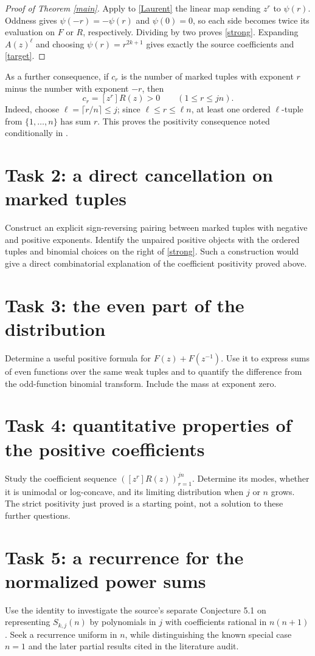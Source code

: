 \documentclass[11pt]{article}
\begin{document}
\begin{proof}[Proof of Theorem \ref{main}]
Apply to \eqref{Laurent} the linear map sending $z^r$ to
$\psi(r)$. Oddness gives $\psi(-r)=-\psi(r)$ and $\psi(0)=0$,
so each side becomes twice its evaluation on $F$ or $R$,
respectively. Dividing by two proves \eqref{strong}. Expanding
$A(z)^\ell$ and choosing $\psi(r)=r^{2k+1}$ gives exactly the
source coefficients and \eqref{target}.
\end{proof}

As a further consequence, if $c_r$ is the number of marked tuples
with exponent $r$ minus the number with exponent $-r$, then
\[
 c_r=[z^r]R(z)>0\qquad(1\leq r\leq jn).
\]
Indeed, choose $\ell=\lceil r/n\rceil\leq j$; since
$\ell\leq r\leq\ell n$, at least one ordered $\ell$-tuple from
$\{1,\ldots,n\}$ has sum $r$. This proves the positivity
consequence noted conditionally in \cite{SS}.

\section*{Task 2: a direct cancellation on marked tuples}
Construct an explicit sign-reversing pairing between marked
tuples with negative and positive exponents. Identify the
unpaired positive objects with the ordered tuples and binomial
choices on the right of \eqref{strong}. Such a construction would
give a direct combinatorial explanation of the coefficient
positivity proved above.

\section*{Task 3: the even part of the distribution}
Determine a useful positive formula for $F(z)+F(z^{-1})$.
Use it to express sums of even functions over the same weak
tuples and to quantify the difference from the odd-function
binomial transform. Include the mass at exponent zero.

\section*{Task 4: quantitative properties of the positive coefficients}
Study the coefficient sequence $([z^r]R(z))_{r=1}^{jn}$.
Determine its modes, whether it is unimodal or log-concave, and
its limiting distribution when $j$ or $n$ grows. The strict
positivity just proved is a starting point, not a solution to
these further questions.

\section*{Task 5: a recurrence for the normalized power sums}
Use the identity to investigate the source's separate Conjecture
5.1 on representing $S_{k,j}(n)$ by polynomials in $j$ with
coefficients rational in $n(n+1)$. Seek a recurrence uniform in
$n$, while distinguishing the known special case $n=1$ and the
later partial results cited in the literature audit.
\end{document}
